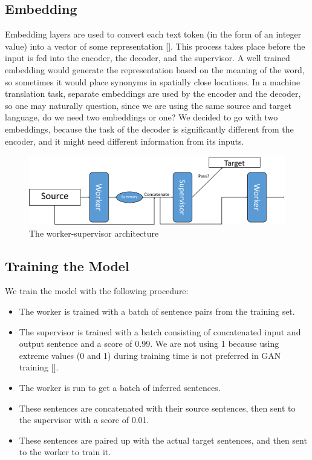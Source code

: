 \documentclass[letterpaper]{article} %
\begin{document}
\subsection{Embedding}
Embedding layers are used to convert each text token (in the form of an integer value) into a vector of some representation []. This process takes place before the input is fed into the encoder, the decoder, and the supervisor. A well trained embedding would generate the representation based on the meaning of the word, so sometimes it would place synonyms in spatially close locations. In a machine translation task, separate embeddings are used by the encoder and the decoder, so one may naturally question, since we are using the same source and target language, do we need two embeddings or one? We decided to go with two embeddings, because the task of the decoder is significantly different from the encoder, and it might need different information from its inputs.

\begin{figure}[h]
	\includegraphics[scale=0.2]{architecture}
	\centering
	\caption{The worker-supervisor architecture}
\end{figure}

\subsection{Training the Model}
We train the model with the following procedure:
\begin{itemize}
	\item The worker is trained with a batch of sentence pairs from the training set.
	\item The supervisor is trained with a batch consisting of concatenated input and output sentence and a score of 0.99. We are not using 1 because using extreme values (0 and 1) during training time is not preferred in GAN training [].
	\item The worker is run to get a batch of inferred sentences.
	\item These sentences are concatenated with their source sentences, then sent to the supervisor with a score of 0.01.
	\item These sentences are paired up with the actual target sentences, and then sent to the worker to train it.
\end{itemize}
\end{document}
